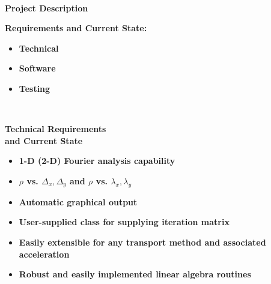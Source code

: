 \baselineskip=0.29in

\newpage
\noindent

\mbox{ }
\vskip0.5in
{\Huge
\begin{center}
{\bf Project Description}
\end{center}
}
\vskip0.5in
{\Huge
\noindent
{\bf Requirements and Current State:}
}
\vskip0.5in
{\Huge
\begin{itemize}
 \item {\bf Technical}
 \item {\bf Software}
 \item {\bf Testing}
\end{itemize}
}
\vskip2.0in


\baselineskip=0.29in
\newpage 
\mbox{ }
\vskip1.0in 

\noindent

{\Huge
\begin{center}
{\bf Technical Requirements}\\
{\bf and Current State}
\end{center}
}
\vskip0.5in
{\Huge
\begin{itemize}
\item {\bf 1-D (2-D) Fourier analysis capability}
\item {\bf ${\rho}$ vs. ${\Delta}_x, {\Delta}_y$ and ${\rho}$
           vs. ${\lambda}_x, {\lambda}_y$}
\item {\bf Automatic graphical output}
\item {\bf User-supplied class for supplying iteration matrix}
\item {\bf Easily extensible for any transport method and associated
           acceleration}
\item {\bf Robust and easily implemented linear algebra routines}
\end{itemize}
}
\vskip2.0in



\baselineskip=0.29in
\newpage 
\mbox{ }
\vskip0.25in 

\noindent

